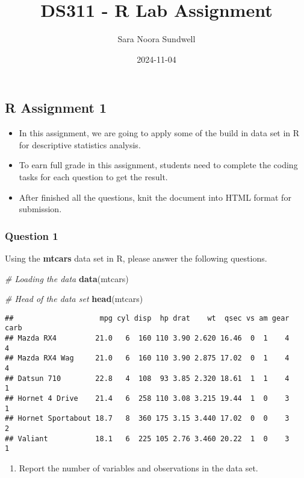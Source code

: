 \documentclass[
]{article}
\title{DS311 - R Lab Assignment}
\author{Sara Noora Sundwell}
\date{2024-11-04}
\newenvironment{Shaded}{\begin{snugshade}}{\end{snugshade}}
\newcommand{\CommentTok}[1]{\textcolor[rgb]{0.56,0.35,0.01}{\textit{#1}}}
\newcommand{\FunctionTok}[1]{\textcolor[rgb]{0.13,0.29,0.53}{\textbf{#1}}}
\newcommand{\NormalTok}[1]{#1}
\providecommand{\tightlist}{%
  \setlength{\itemsep}{0pt}\setlength{\parskip}{0pt}}
\begin{document}
\maketitle

\subsection{R Assignment 1}\label{r-assignment-1}

\begin{itemize}
\tightlist
\item
  In this assignment, we are going to apply some of the build in data
  set in R for descriptive statistics analysis.
\item
  To earn full grade in this assignment, students need to complete the
  coding tasks for each question to get the result.
\item
  After finished all the questions, knit the document into HTML format
  for submission.
\end{itemize}

\subsubsection{Question 1}\label{question-1}

Using the \textbf{mtcars} data set in R, please answer the following
questions.

\begin{Shaded}
\begin{Highlighting}[]
\CommentTok{\# Loading the data}
\FunctionTok{data}\NormalTok{(mtcars)}

\CommentTok{\# Head of the data set}
\FunctionTok{head}\NormalTok{(mtcars)}
\end{Highlighting}
\end{Shaded}

\begin{verbatim}
##                    mpg cyl disp  hp drat    wt  qsec vs am gear carb
## Mazda RX4         21.0   6  160 110 3.90 2.620 16.46  0  1    4    4
## Mazda RX4 Wag     21.0   6  160 110 3.90 2.875 17.02  0  1    4    4
## Datsun 710        22.8   4  108  93 3.85 2.320 18.61  1  1    4    1
## Hornet 4 Drive    21.4   6  258 110 3.08 3.215 19.44  1  0    3    1
## Hornet Sportabout 18.7   8  360 175 3.15 3.440 17.02  0  0    3    2
## Valiant           18.1   6  225 105 2.76 3.460 20.22  1  0    3    1
\end{verbatim}

\begin{enumerate}
\def\labelenumi{\alph{enumi}.}
\tightlist
\item
  Report the number of variables and observations in the data set.
\end{enumerate}
\end{document}
